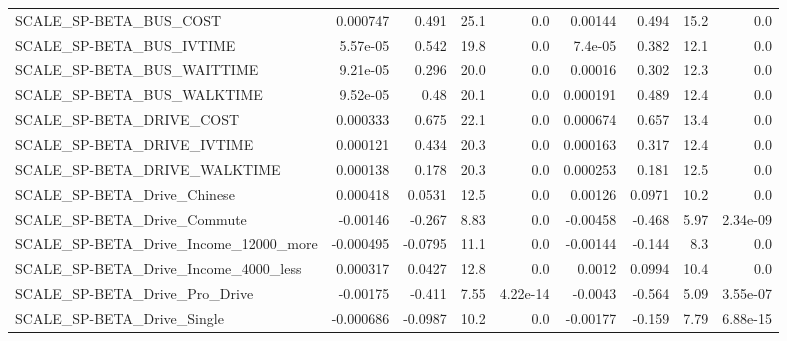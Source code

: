 \begin{tabular}{lrrrrrrrr}
SCALE\_SP-BETA\_BUS\_COST                             &    0.000747 &        0.491 &      25.1 &      0.0 &    0.00144 &       0.494 &         15.2 &           0.0 \\
SCALE\_SP-BETA\_BUS\_IVTIME                           &    5.57e-05 &        0.542 &      19.8 &      0.0 &    7.4e-05 &       0.382 &         12.1 &           0.0 \\
SCALE\_SP-BETA\_BUS\_WAITTIME                         &    9.21e-05 &        0.296 &      20.0 &      0.0 &    0.00016 &       0.302 &         12.3 &           0.0 \\
SCALE\_SP-BETA\_BUS\_WALKTIME                         &    9.52e-05 &         0.48 &      20.1 &      0.0 &   0.000191 &       0.489 &         12.4 &           0.0 \\
SCALE\_SP-BETA\_DRIVE\_COST                           &    0.000333 &        0.675 &      22.1 &      0.0 &   0.000674 &       0.657 &         13.4 &           0.0 \\
SCALE\_SP-BETA\_DRIVE\_IVTIME                         &    0.000121 &        0.434 &      20.3 &      0.0 &   0.000163 &       0.317 &         12.4 &           0.0 \\
SCALE\_SP-BETA\_DRIVE\_WALKTIME                       &    0.000138 &        0.178 &      20.3 &      0.0 &   0.000253 &       0.181 &         12.5 &           0.0 \\
SCALE\_SP-BETA\_Drive\_Chinese                        &    0.000418 &       0.0531 &      12.5 &      0.0 &    0.00126 &      0.0971 &         10.2 &           0.0 \\
SCALE\_SP-BETA\_Drive\_Commute                        &    -0.00146 &       -0.267 &      8.83 &      0.0 &   -0.00458 &      -0.468 &         5.97 &      2.34e-09 \\
SCALE\_SP-BETA\_Drive\_Income\_12000\_more              &   -0.000495 &      -0.0795 &      11.1 &      0.0 &   -0.00144 &      -0.144 &          8.3 &           0.0 \\
SCALE\_SP-BETA\_Drive\_Income\_4000\_less               &    0.000317 &       0.0427 &      12.8 &      0.0 &     0.0012 &      0.0994 &         10.4 &           0.0 \\
SCALE\_SP-BETA\_Drive\_Pro\_Drive                      &    -0.00175 &       -0.411 &      7.55 & 4.22e-14 &    -0.0043 &      -0.564 &         5.09 &      3.55e-07 \\
SCALE\_SP-BETA\_Drive\_Single                         &   -0.000686 &      -0.0987 &      10.2 &      0.0 &   -0.00177 &      -0.159 &         7.79 &      6.88e-15 \\

\end{tabular}
